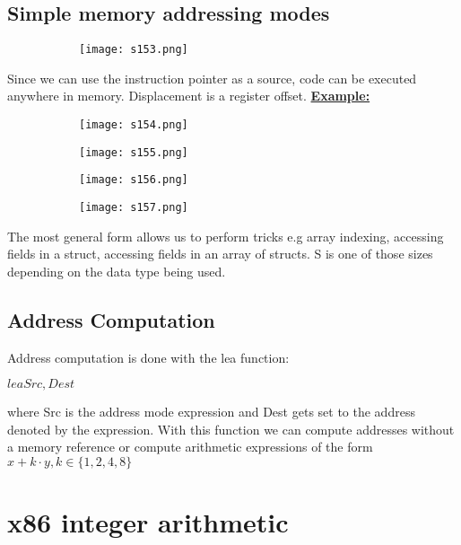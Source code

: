 \documentclass[8pt]{extreport}
\begin{document}
\subsection{Simple memory addressing modes}
\begin{figure}[H]
\centering
\begin{subfigure}[b]{0.4\linewidth}
\texttt{[image: s153.png]}
\end{subfigure}
\end{figure}
Since we can use the instruction pointer as a source, code can be executed anywhere in memory. Displacement is a register offset.
\underline{\textbf{Example:}}
\begin{figure}[H]
\centering
\begin{subfigure}[b]{0.4\linewidth}
\texttt{[image: s154.png]}
\end{subfigure}
\begin{subfigure}[b]{0.4\linewidth}
\texttt{[image: s155.png]}
\end{subfigure}
\begin{subfigure}[b]{0.4\linewidth}
\texttt{[image: s156.png]}
\end{subfigure}
\begin{subfigure}[b]{0.4\linewidth}
\texttt{[image: s157.png]}
\end{subfigure}
\end{figure}
The most general form allows us to perform tricks e.g array indexing, accessing fields in a struct, accessing fields in an array of structs. S is one of those sizes depending on the data type being used.\\
\subsection{Address Computation}
Address computation is done with the lea function:
\begin{center}
$lea Src,Dest$ 
\end{center}
where Src is the address mode expression and Dest gets set to the address denoted by the expression. With this function we can compute addresses without a memory reference or compute arithmetic expressions of the form $x + k\cdot y, k \in \{1,2,4,8\}$
\section{x86 integer arithmetic}
\end{document}
